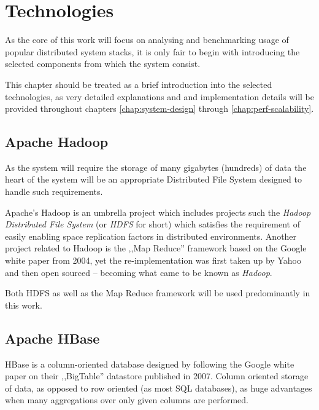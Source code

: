 \chapter{Technologies}
As the core of this work will focus on analysing and benchmarking usage of popular distributed system stacks, it is only fair to begin with introducing the selected components from which the system consist.

This chapter should be treated as a brief introduction into the selected technologies, as very detailed explanations and and implementation details will be provided throughout chapters \ref{chap:system-design} through \ref{chap:perf-scalability}.

\section{Apache Hadoop}
\label{sec:hadoop}
As the system will require the storage of many gigabytes (hundreds) of data the heart of the system will be an appropriate Distributed File System designed to handle such requirements. 

Apache's Hadoop is an umbrella project which includes projects such the \textit{Hadoop Distributed File System} (or \textit{HDFS} for short) which satisfies the requirement of easily enabling space replication factors in distributed environments. Another project related to Hadoop is the ,,Map Reduce'' framework based on the Google white paper \cite{map-reduce} from 2004, yet the re-implementation was first taken up by Yahoo and then open sourced -- becoming what came to be known as \textit{Hadoop}.

Both HDFS as well as the Map Reduce framework will be used predominantly in this work.

\section{Apache HBase}
\label{sec:hbase}

HBase is a column-oriented database \cite{columnar-database} designed by following the Google white paper on their ,,BigTable'' datastore published in 2007.
Column oriented storage of data, as opposed to row oriented (as most SQL databases), as huge advantages when many aggregations over only given columns are performed.

